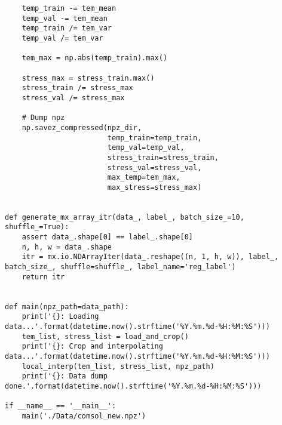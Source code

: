 \begin{verbatim}
    temp_train -= tem_mean
    temp_val -= tem_mean
    temp_train /= tem_var
    temp_val /= tem_var

    tem_max = np.abs(temp_train).max()

    stress_max = stress_train.max()
    stress_train /= stress_max
    stress_val /= stress_max

    # Dump npz
    np.savez_compressed(npz_dir,
                        temp_train=temp_train,
                        temp_val=temp_val,
                        stress_train=stress_train,
                        stress_val=stress_val,
                        max_temp=tem_max,
                        max_stress=stress_max)


def generate_mx_array_itr(data_, label_, batch_size_=10, shuffle_=True):
    assert data_.shape[0] == label_.shape[0]
    n, h, w = data_.shape
    itr = mx.io.NDArrayIter(data_.reshape((n, 1, h, w)), label_, batch_size_, shuffle=shuffle_, label_name='reg_label')
    return itr


def main(npz_path=data_path):
    print('{}: Loading data...'.format(datetime.now().strftime('%Y.%m.%d-%H:%M:%S')))
    tem_list, stress_list = load_and_crop()
    print('{}: Crop and interpolating data...'.format(datetime.now().strftime('%Y.%m.%d-%H:%M:%S')))
    local_interp(tem_list, stress_list, npz_path)
    print('{}: Data dump done.'.format(datetime.now().strftime('%Y.%m.%d-%H:%M:%S')))

if __name__ == '__main__':
    main('./Data/comsol_new.npz')

\end{verbatim}

